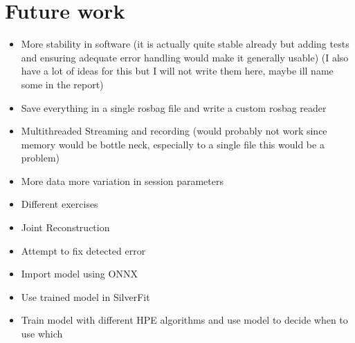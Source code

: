 \section{Future work}
\label{sec:future_work}

\begin{itemize}
  \item More stability in software (it is actually quite stable already but adding tests and ensuring adequate error handling would make it generally usable) (I also have a lot of ideas for this but I will not write them here, maybe ill name some in the report)
  \item Save everything in a single rosbag file and write a custom rosbag reader
  \item Multithreaded Streaming and recording (would probably not work since memory would be bottle neck, especially to a single file this would be a problem)
  \item More data more variation in session parameters
  \item Different exercises
  \item Joint Reconstruction
  \item Attempt to fix detected error
  \item Import model using ONNX 
  \item Use trained model in SilverFit
  \item Train model with different HPE algorithms and use model to decide when to use which
\end{itemize}